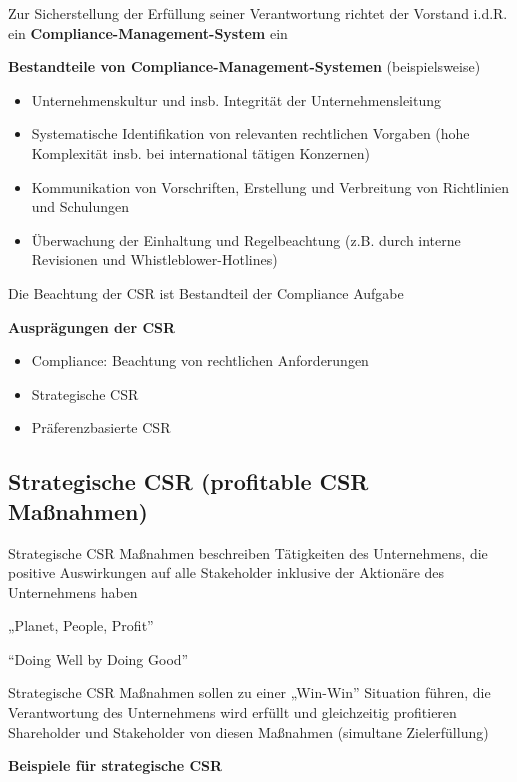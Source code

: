 \documentclass[
]{article}
\providecommand{\tightlist}{%
  \setlength{\itemsep}{0pt}\setlength{\parskip}{0pt}}
\begin{document}
Zur Sicherstellung der Erfüllung seiner Verantwortung richtet der
Vorstand i.d.R. ein \textbf{Compliance-Management-System} ein

\textbf{Bestandteile von Compliance-Management-Systemen}
(beispielsweise)

\begin{itemize}
\tightlist
\item
  Unternehmenskultur und insb. Integrität der Unternehmensleitung
\item
  Systematische Identifikation von relevanten rechtlichen Vorgaben (hohe
  Komplexität insb. bei international tätigen Konzernen)
\item
  Kommunikation von Vorschriften, Erstellung und Verbreitung von
  Richtlinien und Schulungen
\item
  Überwachung der Einhaltung und Regelbeachtung (z.B. durch interne
  Revisionen und Whistleblower-Hotlines)
\end{itemize}

Die Beachtung der CSR ist Bestandteil der Compliance Aufgabe

\textbf{Ausprägungen der CSR}

\begin{itemize}
\tightlist
\item
  Compliance: Beachtung von rechtlichen Anforderungen
\item
  Strategische CSR
\item
  Präferenzbasierte CSR
\end{itemize}

\hypertarget{strategische-csr-profitable-csr-mauxdfnahmen}{%
\subsection{Strategische CSR (profitable CSR
Maßnahmen)}\label{strategische-csr-profitable-csr-mauxdfnahmen}}

Strategische CSR Maßnahmen beschreiben Tätigkeiten des Unternehmens, die
positive Auswirkungen auf alle Stakeholder inklusive der Aktionäre des
Unternehmens haben

„Planet, People, Profit''

``Doing Well by Doing Good''

Strategische CSR Maßnahmen sollen zu einer „Win-Win'' Situation führen,
die Verantwortung des Unternehmens wird erfüllt und gleichzeitig
profitieren Shareholder und Stakeholder von diesen Maßnahmen (simultane
Zielerfüllung)

\textbf{Beispiele für strategische CSR}
\end{document}
